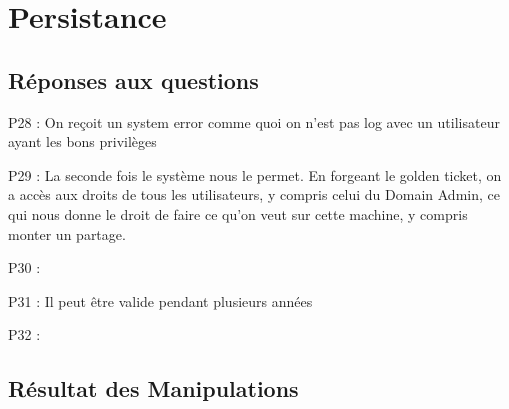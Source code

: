 \documentclass[12pt]{report} %
\begin{document}
\newpage

\section*{Persistance}

\subsection*{Réponses aux questions}
\par P28	: On reçoit un system error comme quoi on n'est pas log avec un utilisateur ayant les bons privilèges
\par P29	: La seconde fois le système nous le permet. En forgeant le golden ticket, on a accès aux droits de tous les utilisateurs,
y compris celui du Domain Admin, ce qui nous donne le droit de faire ce qu'on veut sur cette machine, y compris monter un partage.
\par P30	: 
\par P31	: Il peut être valide pendant plusieurs années
\par P32	: 

\subsection*{Résultat des Manipulations}
\end{document}
